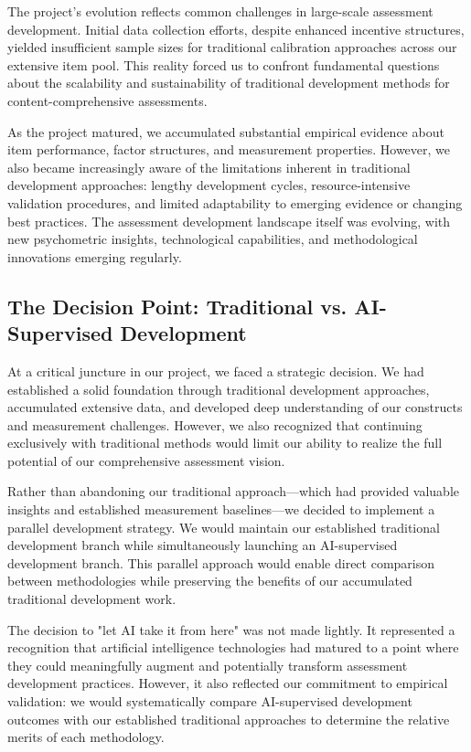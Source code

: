 \documentclass[12pt,a4paper]{article}
\begin{document}
The project's evolution reflects common challenges in large-scale assessment development. Initial data collection efforts, despite enhanced incentive structures, yielded insufficient sample sizes for traditional calibration approaches across our extensive item pool. This reality forced us to confront fundamental questions about the scalability and sustainability of traditional development methods for content-comprehensive assessments.

As the project matured, we accumulated substantial empirical evidence about item performance, factor structures, and measurement properties. However, we also became increasingly aware of the limitations inherent in traditional development approaches: lengthy development cycles, resource-intensive validation procedures, and limited adaptability to emerging evidence or changing best practices. The assessment development landscape itself was evolving, with new psychometric insights, technological capabilities, and methodological innovations emerging regularly.

\subsection{The Decision Point: Traditional vs. AI-Supervised Development}

At a critical juncture in our project, we faced a strategic decision. We had established a solid foundation through traditional development approaches, accumulated extensive data, and developed deep understanding of our constructs and measurement challenges. However, we also recognized that continuing exclusively with traditional methods would limit our ability to realize the full potential of our comprehensive assessment vision.

Rather than abandoning our traditional approach—which had provided valuable insights and established measurement baselines—we decided to implement a parallel development strategy. We would maintain our established traditional development branch while simultaneously launching an AI-supervised development branch. This parallel approach would enable direct comparison between methodologies while preserving the benefits of our accumulated traditional development work.

The decision to "let AI take it from here" was not made lightly. It represented a recognition that artificial intelligence technologies had matured to a point where they could meaningfully augment and potentially transform assessment development practices. However, it also reflected our commitment to empirical validation: we would systematically compare AI-supervised development outcomes with our established traditional approaches to determine the relative merits of each methodology.
\end{document}
